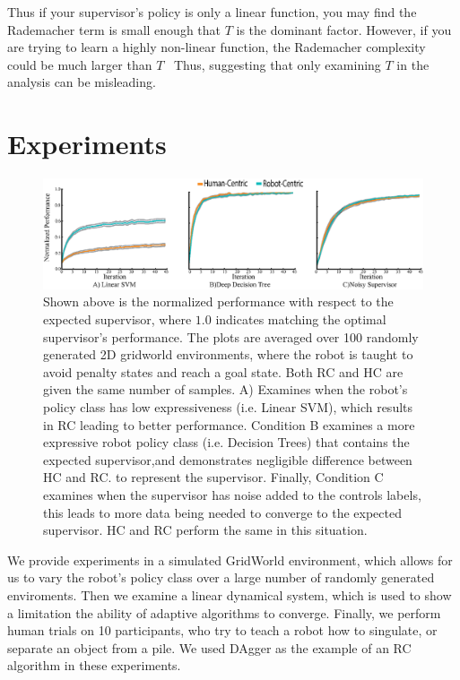 \documentclass[10pt, conference]{ieeeconf}      %
\begin{document}
Thus if your supervisor's policy is only a linear function, you may find the Rademacher term is small enough that $T$ is the dominant factor. However, if you are trying to learn a highly non-linear function, the Rademacher complexity could be much larger than $T$~\cite{vapnik2013nature} Thus, suggesting that only examining $T$ in the analysis can be misleading. 


\section{Experiments}

\begin{figure}
\includegraphics{f_figs/var_grid.eps}
\caption{
    \footnotesize
Shown above is the normalized performance with respect to the expected supervisor, where $1.0$ indicates matching the optimal supervisor's performance. The plots are averaged over 100 randomly generated 2D gridworld environments,  where the robot is taught to avoid penalty states and reach a goal state. Both RC and HC are given the same number of samples. A) Examines when the robot's policy class has low expressiveness (i.e. Linear SVM), which results in RC  leading to better performance. Condition B examines a more expressive robot policy class (i.e. Decision Trees) that contains the expected supervisor,and demonstrates negligible difference between HC and RC.  to represent the supervisor.  Finally, Condition C examines when the supervisor has noise added to the controls labels, this leads to more data being needed to converge to the expected supervisor. HC and RC perform the same in this situation.  }
\vspace*{-20pt}
\label{fig:var}
\end{figure}

We provide experiments in a simulated GridWorld environment, which allows for us to vary the robot's policy class over a large number of randomly generated enviroments. Then we examine a linear dynamical system, which is used to show a limitation the ability of adaptive algorithms to converge. Finally, we perform human trials on 10 participants, who try to teach a robot how to singulate, or separate an object from a pile. We used DAgger as the example of an RC algorithm in these experiments. 
\end{document}
